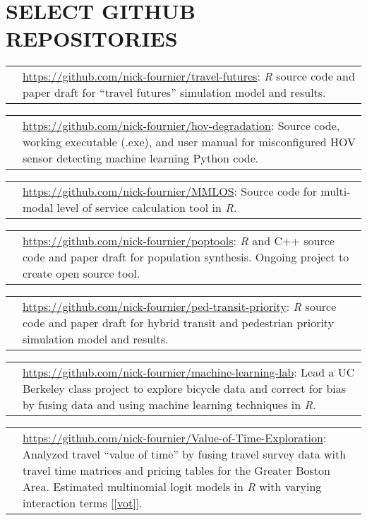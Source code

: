 \documentclass[10pt,letter,sans]{moderncv}
\makeatletter
\newcounter{gitref}
\renewcommand{\thegitref}{[\alph{gitref}]}
\newcommand{\gitcount}{ \refstepcounter{gitref} \thegitref}
\renewcommand*{\cvitem}[3][6pt]{%
	\begin{tabular}{@{}p{\hintscolumnwidth}@{\hspace{\separatorcolumnwidth}}p{\maincolumnwidth}@{}}%
		\raggedleft\hintstyle{#2} &{#3}%
	\end{tabular}%
	\par\addvspace{#1}}
\let\oldsection\section%
\renewcommand{\section}[1]{\leavevmode\unskip\vspace*{-\baselineskip}\oldsection{#1}}%
\makeatother
\begin{document}
	\section{SELECT GITHUB REPOSITORIES}
	\cvitem{\gitcount \label{git:futures}}{\url{https://github.com/nick-fournier/travel-futures}: \textit{R} source code and paper draft for ``travel futures'' simulation model and results.}
	
	\cvitem{\gitcount \label{git:hov}}{ \url{https://github.com/nick-fournier/hov-degradation}: Source code, working executable (.exe), and user manual for misconfigured HOV sensor detecting machine learning Python code.}
	
	\cvitem{\gitcount \label{git:mmlos}}{ \url{https://github.com/nick-fournier/MMLOS}: Source code for multi-modal level of service calculation tool in \textit{R}.}	

	\cvitem{\gitcount \label{git:poptools}}{ \url{https://github.com/nick-fournier/poptools}: \textit{R} and C++ source code and paper draft for population synthesis. Ongoing project to create open source tool.}
			
	\cvitem{\gitcount \label{git:ped-transit}}{ \url{https://github.com/nick-fournier/ped-transit-priority}: \textit{R} source code and paper draft for hybrid transit and pedestrian priority simulation model and results.}
		
		
	\cvitem{\gitcount \label{git:mltutorial}}{ \url{https://github.com/nick-fournier/machine-learning-lab}: Lead a UC Berkeley class project to explore bicycle data and correct for bias by fusing data and using machine learning techniques in \textit{R}.}
	
	
	\cvitem{\gitcount \label{git:mltutorial}}{ \url{https://github.com/nick-fournier/Value-of-Time-Exploration}: Analyzed travel ``value of time'' by fusing travel survey data with travel time matrices and pricing tables for the Greater Boston Area. Estimated multinomial logit models in \textit{R} with varying interaction terms [\ref{vot}]. }
	
\end{document}
